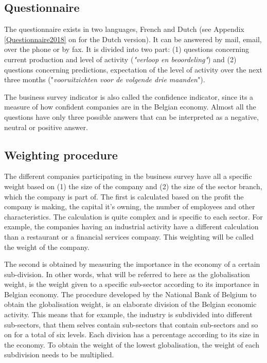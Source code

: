 \documentclass[12pt,a4paper,oneside]{book}
\begin{document}
\subsection{Questionnaire}
\label{sec:Questionnaire}

The questionnaire exists in two languages, French and Dutch (see Appendix \autoref{Questionnaire2018} on  for the Dutch version). It can be answered by mail, email, over the phone or by fax.
It is divided into two part:
(1) questions concerning current production and level of activity (\textit{"verloop en beoordeling"}) and
(2) questions concerning predictions, expectation of the level of activity over the next three months ("\textit{vooruitzichten voor de volgende drie maanden}").

The business survey indicator is also called the confidence indicator, since its a measure of how confident companies are in the Belgian economy.
Almost all the questions have only three possible answers that can be interpreted as a negative, neutral or positive answer.

\subsection{Weighting procedure}
\label{sec:Weighting procedure}

The different companies participating in the business survey have all a specific weight based on (1) the size of the company and (2) the size of the sector branch, which the company is part of.
The first is calculated based on the profit the company is making, the capital it's owning, the number of employees and other characteristics. 
The calculation is quite complex and is specific to each sector. 
For example, the companies having an industrial activity have a different calculation than a restaurant or a financial services company. This weighting will be called the weight of the company.

The second is obtained by measuring the importance in the economy of a certain sub-division. In other words, what will be referred to here as the globalisation weight, is the weight given to a specific sub-sector according to its importance in Belgian economy.
The procedure developed by the National Bank of Belgium to obtain the globalisation weight, is an elaborate division of the Belgian economic activity. This means that for example, the industry is subdivided into different sub-sectors, that them selves contain sub-sectors that contain sub-sectors and so on for a total of six levels. 
Each division has a percentage according to its size in the economy.
To obtain the weight of the lowest globalisation, the weight of each subdivision needs to be multiplied. 
\end{document}
